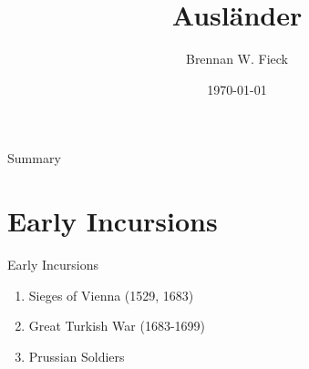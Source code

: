 \documentclass{beamer}
\title[Turks in Germany]{Ausl{\"a}nder}
\date{\today}
\author{Brennan W. Fieck}
\institute{LAIS 418 - Narrating the Notion}
\begin{document}
\frame{\titlepage}
\section{}
\begin{frame}{Summary}
	\tableofcontents
\end{frame}

\section{Early Incursions}
\begin{frame}{Early Incursions}
	\begin{enumerate}
		\item Sieges of Vienna (1529, 1683)
		\item Great Turkish War (1683-1699)
		\item Prussian Soldiers
	\end{enumerate}
\end{frame}
\end{document}
